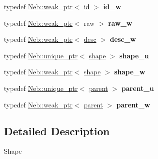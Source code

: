 \begin{DoxyCompactItemize}
\item 
\hypertarget{namespaceNeb_1_1Shape_ae59a49431f67ad0ac70814b1593178a6}{typedef \hyperlink{classNeb_1_1weak__ptr}{\-Neb\-::weak\-\_\-ptr}$<$ \hyperlink{classNeb_1_1Shape_1_1id}{id} $>$ {\bfseries id\-\_\-w}}\label{namespaceNeb_1_1Shape_ae59a49431f67ad0ac70814b1593178a6}

\item 
\hypertarget{namespaceNeb_1_1Shape_a74275b42975051ac9e8286ded79b587d}{typedef \hyperlink{classNeb_1_1weak__ptr}{\-Neb\-::weak\-\_\-ptr}$<$ raw $>$ {\bfseries raw\-\_\-w}}\label{namespaceNeb_1_1Shape_a74275b42975051ac9e8286ded79b587d}

\item 
\hypertarget{namespaceNeb_1_1Shape_a74bd1678acb4029421763c7ad829e174}{typedef \hyperlink{classNeb_1_1weak__ptr}{\-Neb\-::weak\-\_\-ptr}$<$ \hyperlink{classNeb_1_1Shape_1_1desc}{desc} $>$ {\bfseries desc\-\_\-w}}\label{namespaceNeb_1_1Shape_a74bd1678acb4029421763c7ad829e174}

\item 
\hypertarget{namespaceNeb_1_1Shape_a3401af574b843fe67798c446e4f55dd8}{typedef \hyperlink{classNeb_1_1unique__ptr}{\-Neb\-::unique\-\_\-ptr}$<$ \hyperlink{classNeb_1_1Shape_1_1shape}{shape} $>$ {\bfseries shape\-\_\-u}}\label{namespaceNeb_1_1Shape_a3401af574b843fe67798c446e4f55dd8}

\item 
\hypertarget{namespaceNeb_1_1Shape_a73822282be2f02b499b9ea4d036561fb}{typedef \hyperlink{classNeb_1_1weak__ptr}{\-Neb\-::weak\-\_\-ptr}$<$ \hyperlink{classNeb_1_1Shape_1_1shape}{shape} $>$ {\bfseries shape\-\_\-w}}\label{namespaceNeb_1_1Shape_a73822282be2f02b499b9ea4d036561fb}

\item 
\hypertarget{namespaceNeb_1_1Shape_a7a1baca55d0c6ec7ea60b69fcd110652}{typedef \hyperlink{classNeb_1_1unique__ptr}{\-Neb\-::unique\-\_\-ptr}$<$ \hyperlink{classNeb_1_1Shape_1_1parent}{parent} $>$ {\bfseries parent\-\_\-u}}\label{namespaceNeb_1_1Shape_a7a1baca55d0c6ec7ea60b69fcd110652}

\item 
\hypertarget{namespaceNeb_1_1Shape_ace80b8e9cfedc417649b5d4017f814b9}{typedef \hyperlink{classNeb_1_1weak__ptr}{\-Neb\-::weak\-\_\-ptr}$<$ \hyperlink{classNeb_1_1Shape_1_1parent}{parent} $>$ {\bfseries parent\-\_\-w}}\label{namespaceNeb_1_1Shape_ace80b8e9cfedc417649b5d4017f814b9}

\end{DoxyCompactItemize}


\subsection{\-Detailed \-Description}
\-Shape 